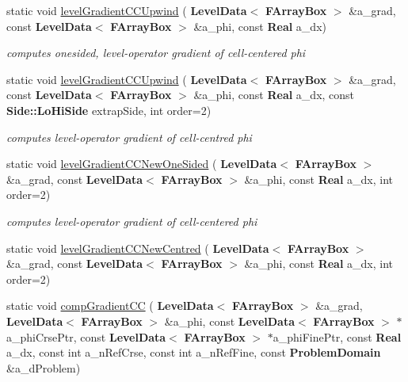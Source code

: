 \begin{DoxyCompactItemize}
static void \hyperlink{class_gradient_ab5fa9029705d216a3c1ae97b58bb970e}{level\+Gradient\+C\+C\+Upwind} (\textbf{ Level\+Data}$<$ \textbf{ F\+Array\+Box} $>$ \&a\+\_\+grad, const \textbf{ Level\+Data}$<$ \textbf{ F\+Array\+Box} $>$ \&a\+\_\+phi, const \textbf{ Real} a\+\_\+dx)
\begin{DoxyCompactList}\small\item\em computes onesided, level-\/operator gradient of cell-\/centered phi \end{DoxyCompactList}\item 
static void \hyperlink{class_gradient_ab55b4c85431294e40707bd0bdae6e012}{level\+Gradient\+C\+C\+Upwind} (\textbf{ Level\+Data}$<$ \textbf{ F\+Array\+Box} $>$ \&a\+\_\+grad, const \textbf{ Level\+Data}$<$ \textbf{ F\+Array\+Box} $>$ \&a\+\_\+phi, const \textbf{ Real} a\+\_\+dx, const \textbf{ Side\+::\+Lo\+Hi\+Side} extrap\+Side, int order=2)
\begin{DoxyCompactList}\small\item\em computes level-\/operator gradient of cell-\/centred phi \end{DoxyCompactList}\item 
static void \hyperlink{class_gradient_a00daa2aa0e66c5f70545cbd9cdf633a2}{level\+Gradient\+C\+C\+New\+One\+Sided} (\textbf{ Level\+Data}$<$ \textbf{ F\+Array\+Box} $>$ \&a\+\_\+grad, const \textbf{ Level\+Data}$<$ \textbf{ F\+Array\+Box} $>$ \&a\+\_\+phi, const \textbf{ Real} a\+\_\+dx, int order=2)
\begin{DoxyCompactList}\small\item\em computes level-\/operator gradient of cell-\/centered phi \end{DoxyCompactList}\item 
static void \hyperlink{class_gradient_a306b5f347d51c38d5cf8a7f446ea0b86}{level\+Gradient\+C\+C\+New\+Centred} (\textbf{ Level\+Data}$<$ \textbf{ F\+Array\+Box} $>$ \&a\+\_\+grad, const \textbf{ Level\+Data}$<$ \textbf{ F\+Array\+Box} $>$ \&a\+\_\+phi, const \textbf{ Real} a\+\_\+dx, int order=2)
\item 
static void \hyperlink{class_gradient_a6c741fa4909be6c7d55ddc70a128ca93}{comp\+Gradient\+CC} (\textbf{ Level\+Data}$<$ \textbf{ F\+Array\+Box} $>$ \&a\+\_\+grad, \textbf{ Level\+Data}$<$ \textbf{ F\+Array\+Box} $>$ \&a\+\_\+phi, const \textbf{ Level\+Data}$<$ \textbf{ F\+Array\+Box} $>$ $\ast$a\+\_\+phi\+Crse\+Ptr, const \textbf{ Level\+Data}$<$ \textbf{ F\+Array\+Box} $>$ $\ast$a\+\_\+phi\+Fine\+Ptr, const \textbf{ Real} a\+\_\+dx, const int a\+\_\+n\+Ref\+Crse, const int a\+\_\+n\+Ref\+Fine, const \textbf{ Problem\+Domain} \&a\+\_\+d\+Problem)

\end{DoxyCompactItemize}
